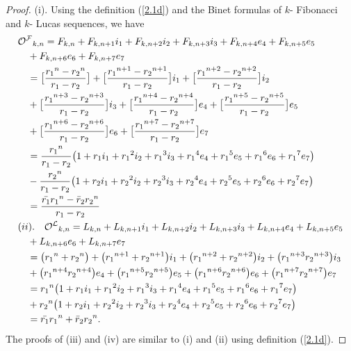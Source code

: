 \begin{proof}
(i). Using the definition (\ref{2.1d}) and the Binet formulas of $k$- Fibonacci and $k$- Lucas sequences, we have
\begin{align*}
&{{\mathcal{O^F}}}_{k,n}=F_{k,n}+F_{k,n+1}i_1+F_{k,n+2}i_2+F_{k,n+3}i_3+F_{k,n+4}e_4+F_{k,n+5}e_5\\&\quad +F_{k,n+6}e_6+F_{k,n+7}e_7\\
&\quad = \big[\dfrac{{r_1}^n-{r_2}^n}{r_1-r_2}\big]+\big[\dfrac{{r_1}^{n+1}-{r_2}^{n+1}}{r_1-r_2}\big]i_1+\big[\dfrac{{r_1}^{n+2}-{r_2}^{n+2}}{r_1-r_2}\big]i_2\\&\quad +\big[\dfrac{{r_1}^{n+3}-{r_2}^{n+3}}{r_1-r_2}\big]i_3+\big[\dfrac{{r_1}^{n+4}-{r_2}^{n+4}}{r_1-r_2}\big]e_4+\big[\dfrac{{r_1}^{n+5}-{r_2}^{n+5}}{r_1-r_2}\big]e_5\\&\quad +\big[\dfrac{{r_1}^{n+6}-{r_2}^{n+6}}{r_1-r_2}\big]e_6+\big[\dfrac{{r_1}^{n+7}-{r_2}^{n+7}}{r_1-r_2}\big]e_7\\
&\quad =\dfrac{{r_1}^n}{r_1-r_2}\big(1+r_1i_1+{r_1}^2i_2+{r_1}^3i_3+{r_1}^4e_4+{r_1}^5e_5+{r_1}^6e_6+{r_1}^7e_7\big)\\&\quad -\dfrac{{r_2}^n}{r_1-r_2}\big(1+r_2i_1+{r_2}^2i_2+{r_2}^3i_3+{r_2}^4e_4+{r_2}^5e_5+{r_2}^6e_6+{r_2}^7e_7\big)\\
&\quad =\dfrac{\bar{r_1}{{r_1}}^n-\bar
r_2{r_{2}}^n}{r_1-r_2}\\
&(ii).\quad {{\mathcal{O^L}}}_{k,n}=L_{k,n}+L_{k,n+1}i_1+L_{k,n+2}i_2+L_{k,n+3}i_3+L_{k,n+4}e_4+L_{k,n+5}e_5\\&\quad +L_{k,n+6}e_6+L_{k,n+7}e_7\\
&\quad = \big({r_1}^n+{r_2}^n\big)+\big({r_1}^{n+1}+{r_2}^{n+1}\big)i_1+\big({r_1}^{n+2}+{r_2}^{n+2}\big)i_2+\big({r_1}^{n+3}{r_2}^{n+3}\big)i_3\\&\quad +\big({r_1}^{n+4}{r_2}^{n+4}\big)e_4+\big({r_1}^{n+5}{r_2}^{n+5}\big)e_5+\big({r_1}^{n+6}{r_2}^{n+6}\big)e_6+\big({r_1}^{n+7}{r_2}^{n+7}\big)e_7\\
&\quad ={r_1}^n\big(1+r_1i_1+{r_1}^2i_2+{r_1}^3i_3+{r_1}^4e_4+{r_1}^5e_5+{r_1}^6e_6+{r_1}^7e_7\big)\\&\quad +{r_2}^n\big(1+r_2i_1+{r_2}^2i_2+{r_2}^3i_3+{r_2}^4e_4+{r_2}^5e_5+{r_2}^6e_6+{r_2}^7e_7\big)\\
&\quad =\bar{r_1}{{r_1}}^n+\bar
r_2{r_{2}}^n.
\end{align*}
The proofs of (iii) and (iv) are similar to (i) and (ii) using definition (\ref{2.1d}).
\end{proof}
